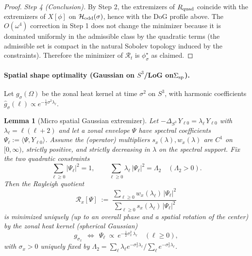 \documentclass[10pt]{article}
\theoremstyle{definition}
\theoremstyle{plain}
\newtheorem{lemma}{Lemma}[section]
\begin{document}
\begin{proof}
\medskip
\textit{Step 4 (Conclusion).}
By Step 2, the extremizers of $R_{\rm quad}$ coincide with the extremizers of $X[\phi]$ on $\mathcal H_{\rm odd}(\sigma)$, hence with the DoG profile above. The $O(\omega^4)$ correction in Step 1 does not change the minimizer because it is dominated uniformly in the admissible class by the quadratic terms (the admissible set is compact in the natural Sobolev topology induced by the constraints). Therefore the minimizer of $\mathcal R_t$ is $\phi^\star_\sigma$ as claimed.
\end{proof}


\paragraph{Spatial shape optimality (Gaussian on $S^3$/LoG on$\Sigma_{\rm sp}$).}\label{par:uom-main-060}
Let $g_{\sigma}(\Omega)$ be the zonal heat kernel at time $\sigma^2$ on $S^3$,
with harmonic coefficients $\widehat g_\sigma(\ell)\propto e^{-\frac12\sigma^2\lambda_\ell}$.

\begin{lemma}[Micro spatial Gaussian extremizer]
\label{lem:spatial-gauss}
Let $-\Delta_{S^3}\,Y_{\ell 0}=\lambda_\ell\,Y_{\ell 0}$ with $\lambda_\ell=\ell(\ell+2)$ and let a zonal envelope $\Psi$ have spectral coefficients $\Psi_\ell:=\langle \Psi,Y_{\ell 0}\rangle$.
Assume the (operator) multipliers $s_x(\lambda),w_x(\lambda)$ are $C^1$ on $[0,\infty)$, strictly positive, and strictly decreasing in $\lambda$ on the spectral support. Fix the two quadratic constraints
\[
\sum_{\ell\ge 0} |\Psi_\ell|^2 = 1,\qquad
\sum_{\ell\ge 0} \lambda_\ell\,|\Psi_\ell|^2 = \Lambda_2\quad(\Lambda_2>0).
\]
Then the Rayleigh quotient
\[
\mathcal R_x[\Psi]\;:=\;\frac{\sum_{\ell\ge 0} w_x(\lambda_\ell)\,|\Psi_\ell|^2}{\sum_{\ell\ge 0} s_x(\lambda_\ell)\,|\Psi_\ell|^2}
\]
is minimized uniquely (up to an overall phase and a spatial rotation of the center) by the \emph{zonal heat kernel} (spherical Gaussian)
\[
g_{\sigma_x}\ \ \Longleftrightarrow\ \ \Psi_\ell\ \propto\ e^{-\frac12\sigma_x^2\,\lambda_\ell}\quad(\ell\ge 0),
\]
with $\sigma_x>0$ uniquely fixed by $\Lambda_2=\sum_\ell \lambda_\ell e^{-\sigma_x^2\lambda_\ell}/\sum_\ell e^{-\sigma_x^2\lambda_\ell}$.
\end{lemma}
\end{document}
